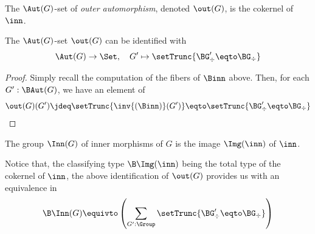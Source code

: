 \newcommand{\outaut}{\constant{out}}%
\begin{definition}
  The $\Aut(G)$-set of {\em outer automorphism}, denoted $\out(G)$, is the
  cokernel of $\inn$.
\end{definition}
\begin{lemma}\label{lemma:coker-out-action}%
  The $\Aut(G)$-set $\out(G)$ can be identified with
  \begin{displaymath}
    \Aut(G) \to \Set, \quad G' \mapsto \setTrunc{\BG'_\div \eqto \BG_\div}
  \end{displaymath}
\end{lemma}
\begin{proof}
  Simply recall the computation of the fibers of $\Binn$ above. Then, for each
  $G':\BAut(G)$, we have an element of
  \begin{displaymath}
    \out(G)(G') \jdeq \setTrunc{\inv{(\Binn)}(G')} \eqto \setTrunc{\BG'_\div \eqto \BG_\div}
  \end{displaymath}
\end{proof}

\begin{definition}
  The group $\Inn(G)$ of inner morphisms of $G$ is the image $\Img (\inn)$ of
  $\inn$.
\end{definition}
Notice that, the classifying type $\B\Img(\inn)$ being the total type of the
cokernel of $\inn$, the above identification of $\out(G)$ provides us with an
equivalence in
\begin{displaymath}
  \B\Inn(G) \equivto \left( \sum_{G':\Group} \setTrunc{\BG'_\div \eqto \BG_\div} \right)
\end{displaymath}

